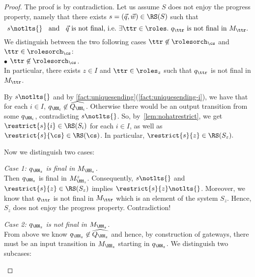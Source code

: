 \begin{proof}
The proof is by contradiction.
Let us assume $S$ does not enjoy the progress property, namely that there exists 
 $s= (\vec{q},\vec{w}) \in \RS(S)$ such that
 \begin{equation}
 \label{eq:snotprogr}
 \text{$s\notlts{}\hspace{2mm}$ and $\hspace{2mm}\vec{q}$ is not final, i.e.\
 $\exists \ttr\in\roles. ~ q_\ttr \text{ is not final in } M_\ttr$.}
\end{equation}
We distinguish between the two following cases $\ttr\not\in\rolesorch_{\cs}$ and $\ttr\in\rolesorch_{\cs}$:\\[2mm]
$\bullet$ $\ttr\not\in\rolesorch_{\cs}$.\\
In particular, there exists $z \in I$ and $\ttr \in \roles_z$ such that $q_\ttr$ is not final in $M_\ttr$.


By $s\notlts{}$  and by \cref{fact:uniquesending}(\ref{fact:uniquesending-i}), we have that
for each $i\in I$, $q_{\HH_i}\not\in\widehat{Q_{\HH_i}}$. Otherwise
there would be an output transition from some $q_{\HH_i}$, contradicting $s\notlts{}$.
So, by~\cref{lem:nohatrestrict}, we get $\restrict{s}{i}\in \RS(S_i)$ for each $i\in I$, as well as $\restrict{s}{\cs}\in \RS(\cs)$. 
In particular, $\restrict{s}{z}\in \RS(S_z).$

Now we distinguish two cases:
\begin{description}
\item \emph{Case 1: $q_{\HH_z}$ is final in $M_{\HH_z}$.}\\
Then $q_{\HH_z}$ is final in $M^z_{\HH_z}$.
Consequently, $s\notlts{}$ and $\restrict{s}{z}\in \RS(S_z)$ implies $\restrict{s}{z}\notlts{}$. Moreover, we know that $q_\ttr$ is not final in $M_\ttr$ which is
an element of the system $S_z$. Hence, $S_z$ does not enjoy the progress property. Contradiction!

\item \emph{Case 2: $q_{\HH_z}$ is not final in $M_{\HH_z}$.}\\
From above we know  $q_{\HH_z}\not\in\widehat{Q_{\HH_z}}$ and hence,
by construction of gateways,
there must be an input transition in $M_{\HH_z}$ starting in $q_{\HH_z}$.
We distinguish two subcases:


\end{description}
\end{proof}
